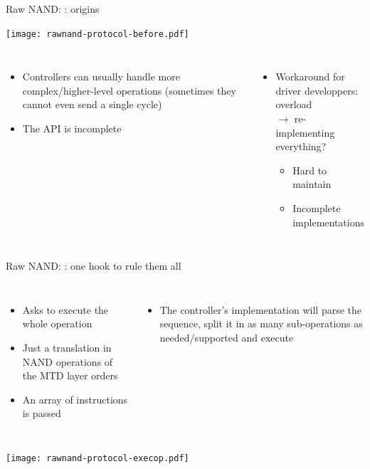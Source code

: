\documentclass[aspectratio=169,obeyspaces,spaces,hyphens,dvipsnames]{beamer}
\begin{document}
\begin{frame}{Raw NAND: {\bf{}}: origins}
  \begin{center}
    \texttt{[image: rawnand-protocol-before.pdf]}
  \end{center}
  \vfill
  \begin{columns}
    \begin{itemize}
    \item Controllers can usually handle more complex/higher-level
      operations (sometimes they cannot even send a single cycle)
    \item The API is incomplete
    \end{itemize}
    \begin{itemize}
    \item Workaround for driver developpers: overload
      \\ $\rightarrow$ re-implementing everything?
      \begin{itemize}
      \item Hard to maintain
      \item Incomplete implementations
      \end{itemize}
    \end{itemize}
  \end{columns}
\end{frame}

\begin{frame}{Raw NAND: {\bf{}}: one hook to rule
      them all}
  \begin{columns}
    \begin{itemize}
    \item Asks to execute the whole operation
    \item Just a translation in NAND operations of the MTD layer orders
    \item An array of instructions is passed
    \end{itemize}
    \begin{itemize}
    \item The controller's implementation will parse the sequence, split
      it in as many sub-operations as needed/supported and execute
    \end{itemize}
  \end{columns}
  \vfill
  \begin{center}
    \texttt{[image: rawnand-protocol-execop.pdf]}
  \end{center}
\end{frame}
\end{document}
